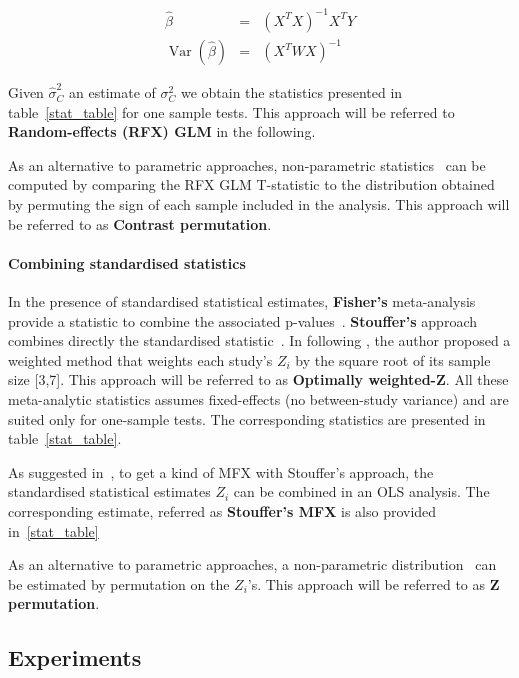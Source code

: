 \documentclass{llncs}
\DeclareMathOperator{\Var}{Var}
\newcommand{\effectvector}{Y}
\newcommand{\zeffect}[1][i]{Z_{#1}}
\newcommand{\varCombined}{\sigma^2_{C}}
\newcommand{\transpose}{^T}
\begin{document}
\begin{eqnarray}
	\hat \beta  &=& (X\transpose X)^{-1} X\transpose \effectvector \\
	\Var(\hat \beta)  &=& (X\transpose W X)^{-1}
	\label{eq_OLS}
\end{eqnarray}

Given $\hat\varCombined$ an estimate of $\varCombined$ we obtain the statistics presented in table~\ref{stat_table} for one sample tests. This approach will be referred to \textbf{Random-effects (RFX) GLM} in the following.

As an alternative to parametric approaches, non-parametric statistics~\cite{Holmes1996,Nichols2002} can be computed by comparing the RFX GLM T-statistic to the distribution obtained by permuting the sign of each sample included in the analysis. This approach will be referred to as \textbf{Contrast permutation}.

\paragraph{Combining standardised statistics} 
In the presence of standardised statistical estimates, \textbf{Fisher's} meta-analysis provide a statistic to combine the associated p-values~\cite{Fisher1932}. \textbf{Stouffer's} approach combines directly the standardised statistic~\cite{Stouffer1949}. In \cite{Zaykin2011} following \cite{Liptak1958}, the author proposed a weighted method that weights each study's $\zeffect$ by the square root of its sample size [3,7]. This approach will be referred to as \textbf{Optimally weighted-Z}. All these meta-analytic statistics assumes fixed-effects (no between-study variance) and are suited only for one-sample tests. The corresponding statistics are presented in table~\ref{stat_table}.

As suggested in~\cite{Salimi-khorshidi2009}, to get a kind of MFX with Stouffer's approach, the standardised statistical estimates $\zeffect$ can be combined in an OLS analysis. The corresponding estimate, referred as \textbf{Stouffer's MFX} is also provided in~\ref{stat_table}

As an alternative to parametric approaches, a non-parametric distribution~\cite{Holmes1996,Nichols2002} can be estimated by permutation on the $\zeffect$'s. This approach will be referred to as \textbf{Z permutation}.

\subsection{Experiments}
\end{document}

